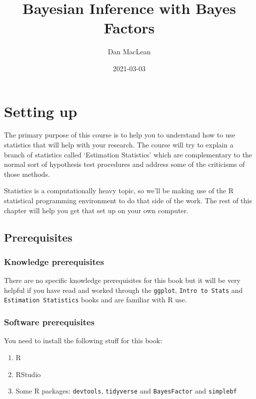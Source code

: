 \documentclass[
]{book}
\title{Bayesian Inference with Bayes Factors}
\author{Dan MacLean}
\date{2021-03-03}
\providecommand{\tightlist}{%
  \setlength{\itemsep}{0pt}\setlength{\parskip}{0pt}}
\begin{document}
\maketitle

{
\setcounter{tocdepth}{1}
\tableofcontents
}
\hypertarget{setting-up}{%
\chapter{Setting up}\label{setting-up}}

The primary purpose of this course is to help you to understand how to use statistics that will help with your research. The course will try to explain a branch of statistics called `Estimation Statistics' which are complementary to the normal sort of hypothesis test procedures and address some of the criticisms of those methods.

Statistics is a computationally heavy topic, so we'll be making use of the R statistical programming environment to do that side of the work. The rest of this chapter will help you get that set up on your own computer.

\hypertarget{prerequisites}{%
\section{Prerequisites}\label{prerequisites}}

\hypertarget{knowledge-prerequisites}{%
\subsection{Knowledge prerequisites}\label{knowledge-prerequisites}}

There are no specific knowledge prerequisites for this book but it will be very helpful if you have read and worked through the \texttt{ggplot}, \texttt{Intro\ to\ Stats} and \texttt{Estimation\ Statistics} books and are familiar with R use.

\hypertarget{software-prerequisites}{%
\subsection{Software prerequisites}\label{software-prerequisites}}

You need to install the following stuff for this book:

\begin{enumerate}
\def\labelenumi{\arabic{enumi}.}
\tightlist
\item
  R
\item
  RStudio
\item
  Some R packages: \texttt{devtools}, \texttt{tidyverse} and \texttt{BayesFactor} and \texttt{simplebf}
\end{enumerate}
\end{document}
